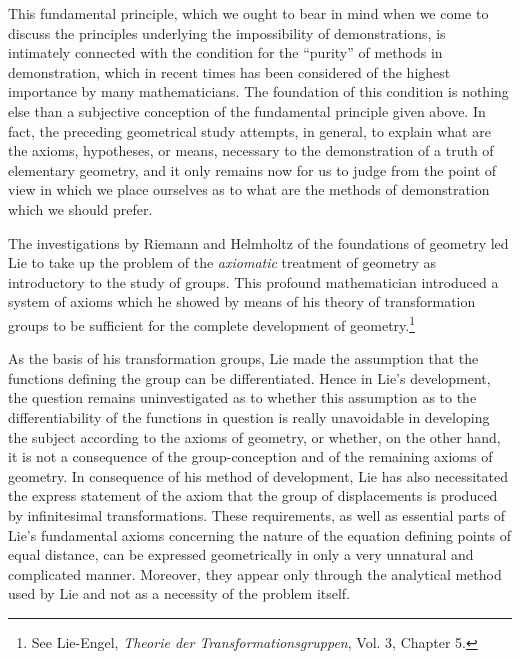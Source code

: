 \documentclass[11pt,oneside]{book}
\begin{document}
This fundamental principle, which we ought to bear
in mind when we come to discuss the principles underlying
the impossibility of demonstrations, is intimately
connected with the condition for the ``purity'' of
methods in demonstration, which in recent times has
been considered of the highest importance by many
mathematicians. The foundation of this condition is
nothing else than a subjective conception of the fundamental
principle given above. In fact, the preceding
geometrical study attempts, in general, to explain
what are the axioms, hypotheses, or means, necessary
to the demonstration of a truth of elementary geometry,
and it only remains now for us to judge from the
point of view in which we place ourselves as to what
are the methods of demonstration which we should
prefer.

\newpage
{}

The investigations by Riemann and Helmholtz of
the foundations of geometry led Lie to take up
the problem of the \textit{axiomatic} treatment of geometry
as introductory to the study of groups. This profound
mathematician introduced a system of axioms which
he showed by means of his theory of transformation
groups to be sufficient for the complete development
of geometry.\footnote{See Lie-Engel,
\textit{Theorie der Transformationsgruppen}, Vol. 3, Chapter 5.}

As the basis of his transformation groups, Lie
made the assumption that the functions defining the
group can be differentiated. Hence in Lie's development,
the question remains uninvestigated as to
whether this assumption as to the differentiability of
the functions in question is really unavoidable in developing
the subject according to the axioms of geometry,
or whether, on the other hand, it is not a
consequence of the group-conception and of the remaining
axioms of geometry. In consequence of his
method of development, Lie has also necessitated the
express statement of the axiom that the group of displacements
is produced by infinitesimal transformations.
These requirements, as well as essential parts
of Lie's fundamental axioms concerning the nature of
the equation defining points of equal distance, can be
expressed geometrically in only a very unnatural and
complicated manner. Moreover, they appear only
through the analytical method used by Lie and not
as a necessity of the problem itself.
\end{document}
